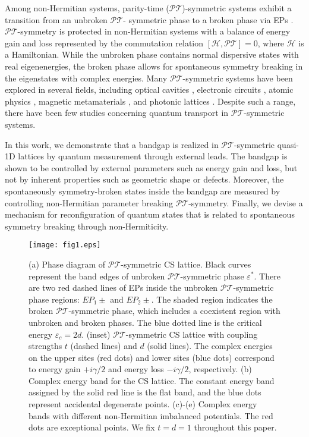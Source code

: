 \documentclass[report,epsfig,pre]{revtex4}
\begin{document}
Among non-Hermitian systems, parity-time ($\mathcal{PT}$)-symmetric systems exhibit a transition from an unbroken $\mathcal{PT}$- symmetric phase to a broken phase via EPs \cite{Ben98, Ben07}. $\mathcal{PT}$-symmetry is protected in non-Hermitian systems with a balance of energy gain and loss represented by the commutation relation $[\mathcal{H},\mathcal{PT}] = 0$, where $\mathcal{H}$ is a Hamiltonian. While the unbroken phase contains normal dispersive states with real eigenenergies, the broken phase allows for spontaneous symmetry breaking in the eigenstates with complex energies. Many $\mathcal{PT}$-symmetric systems have been explored in several fields, including optical cavities \cite{El07, Guo09, Rue10}, electronic circuits \cite{Sch11}, atomic physics \cite{Jog10}, magnetic metamaterials \cite{Laz13}, and photonic lattices \cite{Mak08, Reg12, Cer16}. 
Despite such a range, there have been few studies concerning quantum transport in $\mathcal{PT}$-symmetric systems.

In this work, we demonstrate that a bandgap is realized in $\mathcal{PT}$-symmetric quasi-1D lattices by quantum measurement through external leads. The bandgap is shown to be controlled by external parameters such as energy gain and loss, but not by inherent properties such as geometric shape or defects. Moreover, the spontaneously symmetry-broken states inside the bandgap are measured by controlling non-Hermitian parameter breaking $\mathcal{PT}$-symmetry. Finally, we devise a mechanism for reconfiguration of quantum states that is related to spontaneous symmetry breaking through non-Hermiticity.


\begin{figure}
\centering
\texttt{[image: fig1.eps]}
\caption{(a) Phase diagram of $\mathcal{PT}$-symmetric CS lattice. Black curves represent the band edges of unbroken $\mathcal{PT}$-symmetric phase $\varepsilon^*$. There are two red dashed lines of EPs inside the unbroken $\mathcal{PT}$-symmetric phase regions: $EP_1\pm$ and $EP_2\pm$. The shaded region indicates the broken $\mathcal{PT}$-symmetric phase, which includes a coexistent region with unbroken and broken phases. The blue dotted line is the critical energy $\varepsilon_{c}=2d$. (inset) $\mathcal{PT}$-symmetric CS lattice with coupling strengths $t$ (dashed lines) and $d$ (solid lines). The complex energies on the upper sites (red dots) and lower sites (blue dots) correspond to energy gain $+i \gamma /2$ and energy loss $-i \gamma /2$, respectively. (b) Complex energy band for the CS lattice. The constant energy band assigned by the solid red line is the flat band, and the blue dots represent accidental degenerate points. (c)-(e) Complex energy bands with different non-Hermitian imbalanced potentials. The red dots are exceptional points. We fix $t=d=1$ throughout this paper.
}
\label{fig1}
\end{figure}
\end{document}
